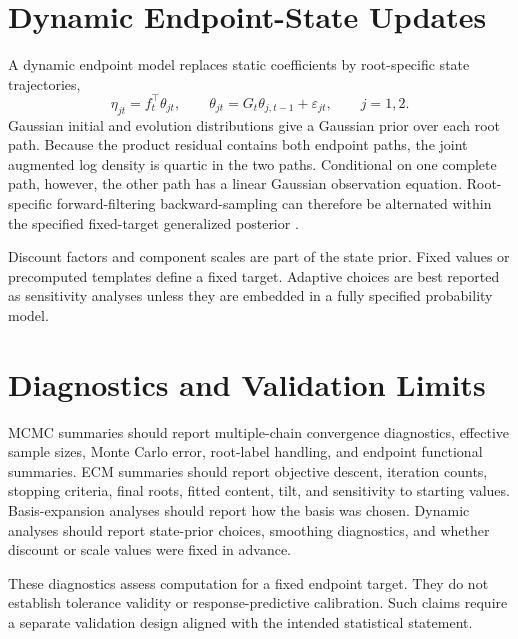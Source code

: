 \documentclass[11pt]{article}
\begin{document}
\section{Dynamic Endpoint-State Updates}
\label{sec:supp-dynamic}

A dynamic endpoint model replaces static coefficients by root-specific state
trajectories,
\[
\eta_{jt}=f_t^\top\theta_{jt},\qquad
\theta_{jt}=G_t\theta_{j,t-1}+\varepsilon_{jt},\qquad j=1,2.
\]
Gaussian initial and evolution distributions give a Gaussian prior over each
root path. Because the product residual contains both endpoint paths, the joint
augmented log density is quartic in the two paths. Conditional on one complete
path, however, the other path has a linear Gaussian observation equation.
Root-specific forward-filtering backward-sampling can therefore be alternated
within the specified fixed-target generalized posterior
\citep{GoncalvesMigonBastos2020DQLM}.

Discount factors and component scales are part of the state prior. Fixed values
or precomputed templates define a fixed target. Adaptive choices are best
reported as sensitivity analyses unless they are embedded in a fully specified
probability model.

\section{Diagnostics and Validation Limits}
\label{sec:supp-diagnostics}

MCMC summaries should report multiple-chain convergence diagnostics, effective
sample sizes, Monte Carlo error, root-label handling, and endpoint functional
summaries. ECM summaries should report objective descent, iteration counts,
stopping criteria, final roots, fitted content, tilt, and sensitivity to
starting values. Basis-expansion analyses should report how the basis was
chosen. Dynamic analyses should report state-prior choices, smoothing
diagnostics, and whether discount or scale values were fixed in advance.

These diagnostics assess computation for a fixed endpoint target. They do not
establish tolerance validity or response-predictive calibration. Such claims
require a separate validation design aligned with the intended statistical
statement.



\end{document}
